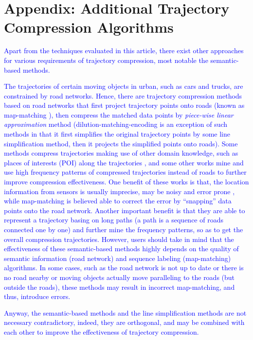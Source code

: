 \section*{{Appendix: Additional Trajectory Compression Algorithms}}
\textcolor{blue}{Apart from the techniques evaluated in this article, there exist other approaches for various requirements of trajectory compression, most notable the semantic-based methods.}

\textcolor{blue}{The trajectories of certain moving objects in urban, such as cars and trucks, are constrained by road networks. Hence, there are trajectory compression methods based on road networks \cite{Chen:Trajectory, Popa:Spatio,Civilis:Techniques,Hung:Clustering, Kellaris:Map, Song:PRESS, Han:Compress, Cao:Road} that first project trajectory points onto roads (known as map-matching \cite{Quddus:MapMatching}), then compress the matched data points by \emph{piece-wise linear approximation} method \cite{Elmeleegy:Stream, Xie:Stream,Luo:Streaming,ORourke:Fitting} (dilution-matching-encoding \cite{Gotsman:Compaction} is an exception of such methods in that it first simplifies the original trajectory points by some line simplification method, then it projects the simplified points onto roads).}
%
\textcolor{blue}{Some methods \cite{Schmid:Semantic, Richter:Semantic} compress trajectories making use of other domain knowledge, such as places of interests (POI) along the trajectories \cite{Richter:Semantic}, and some other works \cite{Gotsman:Compaction, Song:PRESS, Han:Compress,Koide:CiNCT} mine and use high frequency patterns of compressed trajectories instead of roads to further improve compression effectiveness.}
%
\textcolor{blue}{One benefit of these works is that, the location information from sensors is usually imprecise, may be noisy and error prone \cite{Cao:Road}, while map-matching is believed able to correct the error by “snapping” data points onto the road network.
Another important benefit is that they are able to represent a trajectory basing on long paths (a path is a sequence of roads connected one by one) and further mine the frequency patterns, so as to get the overall compression trajectories.} 
%
\textcolor{blue}{However, users should take in mind that the effectiveness of these semantic-based methods highly depends on the quality of semantic information (\eg road network) and sequence labeling (\eg map-matching) algorithms. In some cases, such as the road network is not up to date or there is no road nearby or moving objects actually move paralleling to the roads (but outside the roads), these methods may result in incorrect map-matching, and thus, introduce errors.}

\textcolor{blue}{Anyway, the semantic-based methods and the line simplification methods are not necessary contradictory, indeed, they are orthogonal, and may be combined with each other to improve the effectiveness of trajectory compression.}



